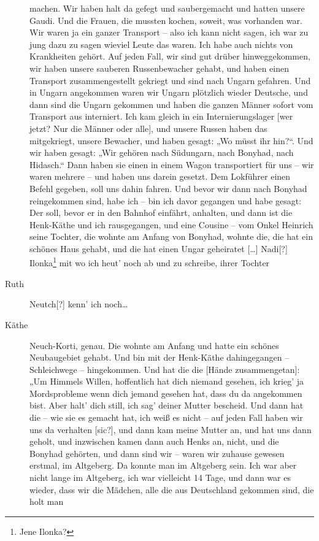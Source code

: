 \documentclass[ngerman,]{article}
\begin{document}
\begin{multicols}{3}
\begin{description}
machen. Wir haben halt da gefegt und saubergemacht und hatten unsere
Gaudi. Und die Frauen, die mussten kochen, soweit, was vorhanden war.
Wir waren ja ein ganzer Transport – also ich kann nicht sagen, ich war
zu jung dazu zu sagen wieviel Leute das waren. Ich habe auch nichts von
Krankheiten gehört. Auf jeden Fall, wir sind gut drüber hinweggekommen,
wir haben unsere sauberen Russenbewacher gehabt, und haben einen
Transport zusammengestellt gekriegt und sind nach Ungarn gefahren. Und
in Ungarn angekommen waren wir Ungarn plötzlich wieder Deutsche, und
dann sind die Ungarn gekommen und haben die ganzen Männer sofort vom
Transport aus interniert. Ich kam gleich in ein Internierungslager
{[}wer jetzt? Nur die Männer oder alle{]}, und unsere Russen haben das
mitgekriegt, unsere Bewacher, und haben gesagt: „Wo müsst ihr hin?“. Und
wir haben gesagt: „Wir gehören nach Südungarn, nach Bonyhad, nach
Hidasch.“ Dann haben sie einen in einem Wagon transportiert für uns –
wir waren mehrere – und haben uns darein gesetzt. Dem Lokführer einen
Befehl gegeben, soll uns dahin fahren. Und bevor wir dann nach Bonyhad
reingekommen sind, habe ich – bin ich davor gegangen und habe gesagt:
Der soll, bevor er in den Bahnhof einfährt, anhalten, und dann ist die
Henk-Käthe und ich rausgegangen, und eine Cousine – vom Onkel Heinrich
seine Tochter, die wohnte am Anfang von Bonyhad, wohnte die, die hat ein
schönes Haus gehabt, und die hat einen Ungar geheiratet {[}\ldots{}{]}
Nadi{[}?{]} Ilonka\footnote{Jene Ilonka?} mit wo ich heut' noch ab und
zu schreibe, ihrer Tochter
\item[Ruth]
Neutch{[}?{]} kenn' ich noch\ldots{}
\item[Käthe]
Neuch-Korti, genau. Die wohnte am Anfang und hatte ein schönes
Neubaugebiet gehabt. Und bin mit der Henk-Käthe dahingegangen –
Schleichwege – hingekommen. Und hat die die {[}Hände zusammengetan{]}:
„Um Himmels Willen, hoffentlich hat dich niemand gesehen, ich krieg' ja
Mordsprobleme wenn dich jemand gesehen hat, dass du da angekommen bist.
Aber halt' dich still, ich sag' deiner Mutter bescheid. Und dann hat die
– wie sie es gemacht hat, ich weiß es nicht – auf jeden Fall haben wir
uns da verhalten {[}sic?{]}, und dann kam meine Mutter an, und hat uns
dann geholt, und inzwischen kamen dann auch Henks an, nicht, und die
Bonyhad gehörten, und dann sind wir – waren wir zuhause gewesen erstmal,
im Altgeberg. Da konnte man im Altgeberg sein. Ich war aber nicht lange
im Altgeberg, ich war vielleicht 14 Tage, und dann war es wieder, dass
wir die Mädchen, alle die aus Deutschland gekommen sind, die holt man

\end{description}
\end{multicols}
\end{document}

